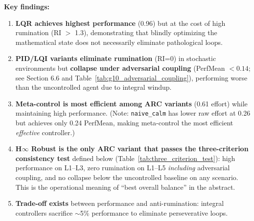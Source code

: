 \documentclass{article}
\begin{document}
\textbf{Key findings:}
\begin{enumerate}
    \item \textbf{LQR achieves highest performance} (0.96) but at the cost of high rumination (RI $>$ 1.3), demonstrating that blindly optimizing the mathematical state does not necessarily eliminate pathological loops.
    \item \textbf{PID/LQI variants eliminate rumination} (RI=0) in stochastic environments but \textbf{collapse under adversarial coupling} (PerfMean $< 0.14$; see Section 6.6 and Table~\ref{tab:g10_adversarial_coupling}), performing worse than the uncontrolled agent due to integral windup.
    \item \textbf{Meta-control is most efficient among ARC variants} (0.61 effort) while maintaining high performance. (Note: \texttt{naive\_calm} has lower raw effort at 0.26 but achieves only 0.24 PerfMean, making meta-control the most efficient \textit{effective} controller.)
    \item \textbf{H$\infty$ Robust is the only ARC variant that passes the three-criterion consistency test} defined below (Table~\ref{tab:three_criterion_test}): high performance on L1--L3, zero rumination on L1--L5 \emph{including} adversarial coupling, and no collapse below the uncontrolled baseline on any scenario. This is the operational meaning of ``best overall balance'' in the abstract.
    \item \textbf{Trade-off exists} between performance and anti-rumination: integral controllers sacrifice $\sim$5\% performance to eliminate perseverative loops.
\end{enumerate}
\end{document}
